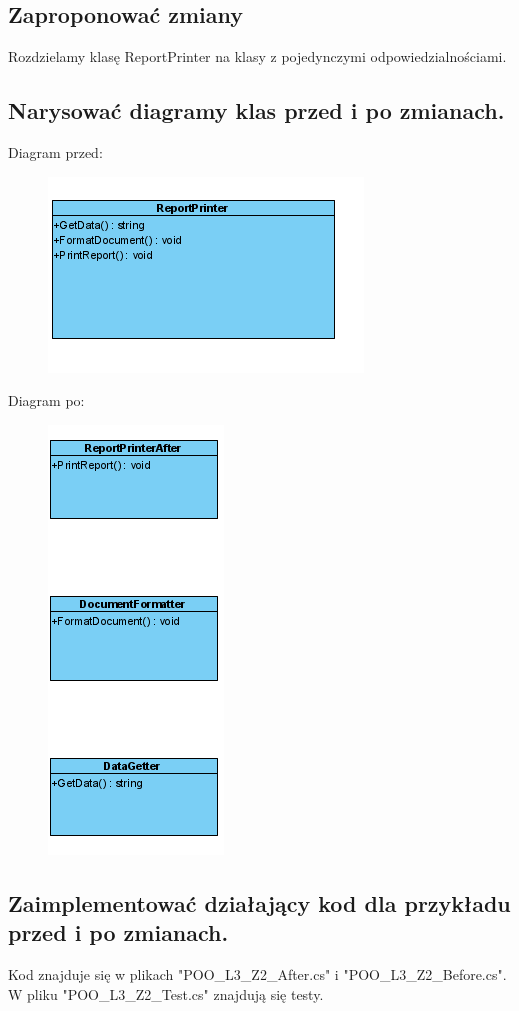 \documentclass[10pt, a4paper]{article}
\begin{document}
\subsection*{Zaproponować zmiany}
Rozdzielamy klasę ReportPrinter na klasy z pojedynczymi odpowiedzialnościami.
\subsection*{Narysować diagramy klas przed i po zmianach.}
Diagram przed:
\begin{figure}[H]
\includegraphics{Before_diagram}
\end{figure}
Diagram po:
\begin{figure}[H]
\includegraphics{After_diagram}
\end{figure}
\subsection*{Zaimplementować działający kod dla przykładu przed i po zmianach.}
Kod znajduje się w plikach "POO\_L3\_Z2\_After.cs" i "POO\_L3\_Z2\_Before.cs". W pliku "POO\_L3\_Z2\_Test.cs" znajdują się testy.
\end{document}
